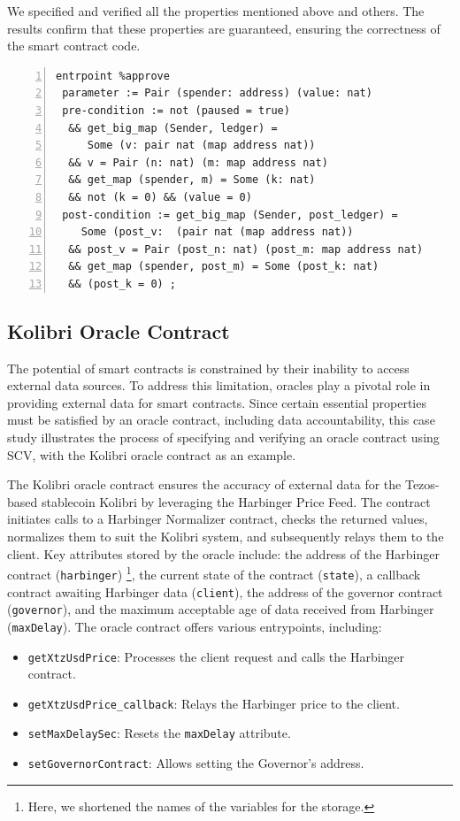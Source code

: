 \documentclass[runningheads]{llncs}
\begin{document}
We specified and verified all the properties mentioned above and others. The results confirm that these properties are guaranteed, ensuring the correctness of the smart contract code.
\begin{lstlisting}[float=tp,captionpos=b,caption={Specification of the \lstinline/approve/ entrypoint (Property 1)},label={lst:specification-approve-p1},numbers=left]
entrpoint %approve
 parameter := Pair (spender: address) (value: nat)
 pre-condition := not (paused = true)
  && get_big_map (Sender, ledger) = 
     Some (v: pair nat (map address nat))
  && v = Pair (n: nat) (m: map address nat) 
  && get_map (spender, m) = Some (k: nat) 
  && not (k = 0) && (value = 0)
 post-condition := get_big_map (Sender, post_ledger) = 
    Some (post_v:  (pair nat (map address nat))
  && post_v = Pair (post_n: nat) (post_m: map address nat) 
  && get_map (spender, post_m) = Some (post_k: nat) 
  && (post_k = 0) ;
\end{lstlisting}
\subsection{Kolibri Oracle Contract}
\label{sec:kolibri-oracle-contr}
The potential of smart contracts is constrained by their inability to access external data sources. To address this limitation, oracles play a pivotal role in providing external data for smart contracts. Since certain essential properties must be satisfied by an oracle contract, including data accountability, this case study illustrates the process of specifying and verifying an oracle contract using SCV, with the Kolibri oracle contract \cite{kolibri} as an example.

The Kolibri oracle contract ensures the accuracy of external data for the Tezos-based stablecoin Kolibri by leveraging the Harbinger Price Feed. The contract initiates calls to a Harbinger Normalizer contract, checks the returned values, normalizes them to suit the Kolibri system, and subsequently relays them to the client. Key attributes stored by the oracle include: the address of the Harbinger contract (\lstinline/harbinger/) \footnote{Here, we shortened the names of the variables for the storage.}, the current state of the contract (\lstinline/state/), a callback contract awaiting Harbinger data (\lstinline/client/), the address of the governor contract (\lstinline/governor/), and the maximum acceptable age of data received from Harbinger (\lstinline/maxDelay/). The oracle contract offers various entrypoints, including:
\begin{itemize}
\item \lstinline/getXtzUsdPrice/: Processes the client request and calls the Harbinger contract.
\item \lstinline/getXtzUsdPrice_callback/: Relays the Harbinger price to the client.
\item \lstinline/setMaxDelaySec/: Resets the \lstinline/maxDelay/ attribute.
\item \lstinline/setGovernorContract/: Allows setting the Governor's address.
\end{itemize}
\end{document}
